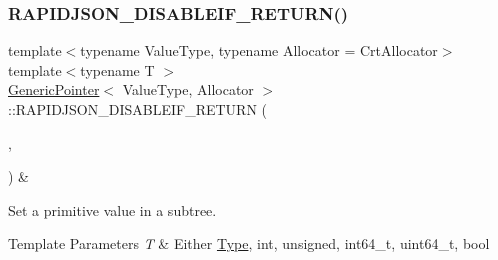 \subsubsection{\texorpdfstring{R\+A\+P\+I\+D\+J\+S\+O\+N\+\_\+\+D\+I\+S\+A\+B\+L\+E\+I\+F\+\_\+\+R\+E\+T\+U\+R\+N()}{RAPIDJSON\_DISABLEIF\_RETURN()}\hspace{0.1cm}{\footnotesize\ttfamily [2/3]}}
{\footnotesize\ttfamily template$<$typename Value\+Type, typename Allocator = Crt\+Allocator$>$ \\
template$<$typename T $>$ \\
\hyperlink{class_generic_pointer}{Generic\+Pointer}$<$ Value\+Type, Allocator $>$\+::R\+A\+P\+I\+D\+J\+S\+O\+N\+\_\+\+D\+I\+S\+A\+B\+L\+E\+I\+F\+\_\+\+R\+E\+T\+U\+RN (\begin{DoxyParamCaption}\item[{(internal\+::\+Or\+Expr$<$ internal\+::\+Is\+Pointer$<$ T $>$, \hyperlink{structinternal_1_1_is_generic_value}{internal\+::\+Is\+Generic\+Value}$<$ T $>$ $>$)}]{,  }\item[{(Value\+Type \&)}]{ }\end{DoxyParamCaption}) \&}



Set a primitive value in a subtree. 


\begin{DoxyTemplParams}{Template Parameters}
{\em T} & Either \hyperlink{rapidjson_8h_a1d1cfd8ffb84e947f82999c682b666a7}{Type}, {\ttfamily int}, {\ttfamily unsigned}, {\ttfamily int64\+\_\+t}, {\ttfamily uint64\+\_\+t}, {\ttfamily bool} \\
\hline
\end{DoxyTemplParams}
\mbox{\label{class_generic_pointer_a1bb4a253f33687734e5b20795632a801}} 
